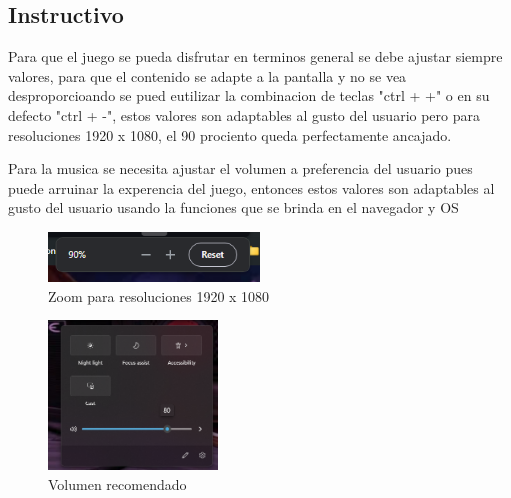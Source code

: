 \documentclass[conference]{IEEEtran}
\begin{document}
\subsection{Instructivo}
Para que el juego se pueda disfrutar en terminos general se debe ajustar siempre valores, para que el contenido se adapte a la pantalla y no se vea desproporcioando se pued eutilizar la combinacion de teclas "ctrl + +" o en su defecto "ctrl + -", estos valores son adaptables al gusto del usuario pero para resoluciones 1920 x 1080, el 90 prociento queda perfectamente ancajado.

Para la musica se necesita ajustar el volumen a preferencia del usuario pues puede arruinar la experencia del juego, entonces estos valores son adaptables al gusto del usuario usando la funciones que se brinda en el navegador y OS
\begin{figure}[h] %
    \centering
    \includegraphics[width=0.5\textwidth]{Zoom.png} %
    \caption{Zoom para resoluciones 1920 x 1080}
    \label{fig:mi_imagen}
\end{figure}

\begin{figure}[h] %
    \centering
    \includegraphics[width=0.4\textwidth]{Volume.png} %
    \caption{Volumen recomendado}
    \label{fig:mi_imagen}
    \vspace{500pt} %
\end{figure}
\end{document}
